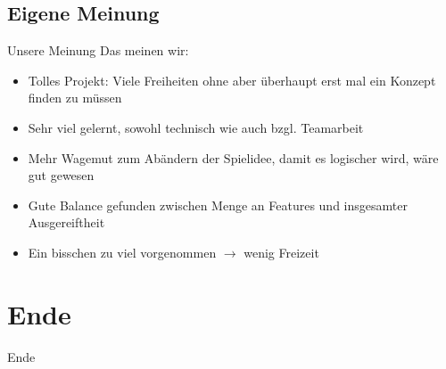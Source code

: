 \documentclass[18pt]{beamer}
\begin{document}
	\subsection{Eigene Meinung}
	\begin{frame}[<+->]{Unsere Meinung}
		Das meinen wir:
		\begin{itemize}
			\item Tolles Projekt: Viele Freiheiten ohne aber überhaupt erst mal ein Konzept finden zu müssen
			\item Sehr viel gelernt, sowohl technisch wie auch bzgl. Teamarbeit
			\item Mehr Wagemut zum Abändern der Spielidee, damit es logischer wird, wäre gut gewesen
			\item Gute Balance gefunden zwischen Menge an Features und insgesamter Ausgereiftheit
			\item Ein bisschen zu viel vorgenommen $\rightarrow$ wenig Freizeit
		\end{itemize}
	\end{frame}


\section{Ende}
	\begin{frame}{Ende}
	\end{frame}

\end{document}
